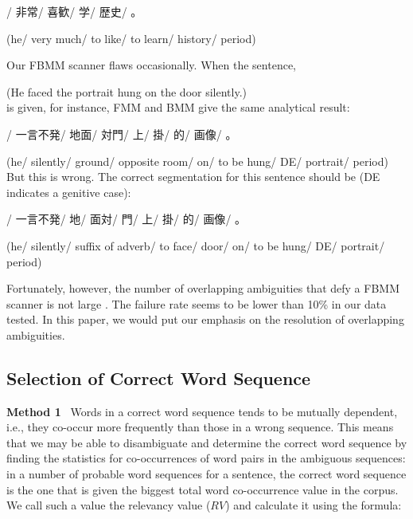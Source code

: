 \hspace*{3zw}{\small 他}/   {\small 非常}/         {\small 喜歓}/    {\small 学}/       {\small 歴史}/     {\small 。}

\hspace*{3zw}(he/  very much/   to like/  to learn/  history/  period)

Our FBMM scanner flaws occasionally. When the sentence,

\hspace*{3zw}{\small 他一言不発地面対門上掛的画像。}(He faced the portrait hung on the door silently.)\\
is given, for instance, FMM and BMM give the same analytical result:

\hspace*{3zw}{\small 他}/   {\small 一言不発}/  {\small 地面}/    {\small 対門}/          {\small 上}/  {\small 掛}/          {\small 的}/    {\small 画像}/     {\small 。}

\hspace*{3zw}(he/   silently/   ground/  opposite room/  on/  to be hung/  DE/   portrait/   period)\\
But this is wrong. The correct segmentation for this sentence should be
(DE indicates a genitive case):

\hspace*{3zw}{\small 他}/  {\small 一言不発}/ {\small 地}/             {\small 面対}/   {\small 門}/   {\small 上}/  {\small 掛}/         {\small 的}/   {\small 画像}/     {\small 。}

\hspace*{3zw}(he/  silently/  suffix of adverb/  to face/ door/  on/  to be hung/  DE/  portrait/  period)

Fortunately, however, the number of overlapping ambiguities that
defy a FBMM scanner is not large \cite{Li98}. 
The failure rate seems to be lower than 10\% in our data tested.
In this paper, we would put our emphasis on the resolution of overlapping ambiguities.

\subsection{Selection of Correct Word Sequence}
\label{seleciton}

{\bf Method 1}~ Words in a correct word sequence tends to be mutually
dependent, i.e., they co-occur more frequently than those in a wrong
sequence. This means that we may be able to disambiguate and determine
the correct word sequence by finding the statistics for co-occurrences
of word pairs in the ambiguous sequences:
in a number of probable word sequences for a sentence,
the correct word sequence is the one that is given the biggest total
word co-occurrence value in the corpus.
We call such a value the relevancy value ($RV$) and calculate it using
the formula:

